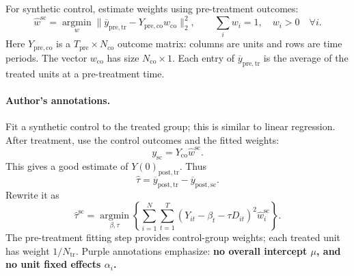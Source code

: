 For synthetic control, estimate weights using pre-treatment outcomes:
\[
\widehat w^{\mathrm{sc}}
=\operatorname*{argmin}_{w}
\|\overline y_{\mathrm{pre,tr}}-Y_{\mathrm{pre,co}}w_{\mathrm{co}}\|_2^2,
\qquad \sum_iw_i=1,\quad w_i>0\quad\forall i.
\]
Here \(Y_{\mathrm{pre,co}}\) is a \(T_{\mathrm{pre}}\times N_{\mathrm{co}}\) outcome matrix: columns are units and rows are time periods. The vector \(w_{\mathrm{co}}\) has size \(N_{\mathrm{co}}\times1\). Each entry of \(\overline y_{\mathrm{pre,tr}}\) is the average of the treated units at a pre-treatment time.

\paragraph{Author's annotations.}
Fit a synthetic control to the treated group; this is similar to linear regression. After treatment, use the control outcomes and the fitted weights:
\[
y_{\mathrm{sc}}=Y_{\mathrm{co}}\widehat w^{\mathrm{sc}}.
\]
This gives a good estimate of \(Y(0)_{\mathrm{post,tr}}\). Thus
\[
\widehat\tau=\overline y_{\mathrm{post,tr}}-\overline y_{\mathrm{post,sc}}.
\]
Rewrite it as
\[
\widehat\tau^{\mathrm{sc}}
=\operatorname*{argmin}_{\beta,\tau}
\left\{\sum_{i=1}^{N}\sum_{t=1}^{T}
(Y_{it}-\beta_t-\tau D_{it})^2\widehat w_i^{\mathrm{sc}}\right\}.
\]
The pre-treatment fitting step provides control-group weights; each treated unit has weight \(1/N_{\mathrm{tr}}\). Purple annotations emphasize: \textbf{no overall intercept \(\mu\), and no unit fixed effects \(\alpha_i\).}

